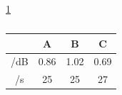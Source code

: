 \documentclass{article}
\begin{document}
\subsubsection{ }
 \ref{table3}
\begin{table}[H]
    \fontsize{10.5bp}{1.25}
    \caption{ }
    \centering\label{table3}
    \begin{tabular}{cccc}
        \toprule[1.5pt]
                & A  & B  & C  \\
        \toprule[1.5pt]
         /dB    & 0.86  & 1.02  & 0.69  \\
         /s & 25    & 25    & 27    \\
        \toprule[1.5pt]
    \end{tabular}
\end{table}
\end{document}
